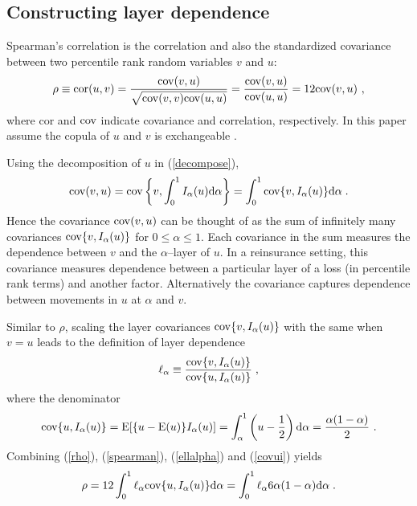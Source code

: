 \documentclass[authoryear]{elsarticle}
\newcommand{\cov}{{\rm cov}}
\newcommand{\E}{{\mathrm E}}
\newcommand{\cor}{\mathrm{cor}}
\newcommand{\de}{\mathrm{d}}
\newcommand{\eref}[1]{(\ref{#1})}
\begin{document}
\subsection{Constructing layer dependence}

Spearman's correlation is the correlation and also the standardized covariance between two percentile rank random variables $v$ and $u$:
\begin{equation}\label{rho}
\rho \equiv \cor(u,v) = \frac{\cov(v,u)}{\sqrt{\cov(v,v)\cov(u,u)}}=\frac{\cov(v,u)}{\cov(u,u)} = 12\cov(v,u)\ ,
\end{equation}
where $\cor$ and $\cov$ indicate covariance and correlation, respectively. In this paper assume the copula of $u$ and $v$ is exchangeable \citep{nelson1999ic}.

Using the decomposition of $u$ in \eref{decompose},
\begin{equation}\label{spearman}
\cov(v,u)=\cov\left\{v,\int_0^1I_\alpha(u)\de \alpha \right\}= \int_0^1 \cov\{v,I_\alpha(u)\} \de \alpha \; .
\end{equation}
Hence the covariance $\cov(v,u)$ can be thought of as the sum  of infinitely many covariances $\cov\{v,I_\alpha(u)\}$ for $0\le\alpha\le 1$. Each covariance in the sum measures the dependence between $v$ and the $\alpha$--layer of $u$. In a reinsurance setting, this covariance measures dependence between a particular layer of a loss (in percentile rank terms) and another factor. Alternatively the covariance captures dependence between movements in $u$ at $\alpha$ and $v$.

 Similar to $\rho$, scaling the layer covariances  $\cov\{v,I_\alpha(u)\}$ with the same when $v=u$ leads to the definition of layer dependence
\begin{equation}\label{ellalpha}
\ell_\alpha \equiv \frac{\cov\{v,I_\alpha(u)\}}{\cov\{u,I_\alpha(u)\}}   \;,
\end{equation}
where the denominator
\begin{equation}\label{covui}
\cov\{u,I_\alpha(u)\}=\E[\{u-\E(u)\}I_\alpha(u)]=\int_\alpha^1 \left(u  - \frac{1}{2}\right)\de \alpha = \frac{\alpha(1-\alpha)}{2}\ .
\end{equation}
Combining \eref{rho}, \eref{spearman}, \eref{ellalpha}  and \eref{covui} yields
\begin{equation}\label{wtdavg}
\rho = 12\int_0^1 \ell_\alpha \cov\{u,I_\alpha(u)\} \de \alpha =  \int_0^1 \ell_\alpha 6\alpha(1-\alpha) \de \alpha \; .
\end{equation}
\end{document}
